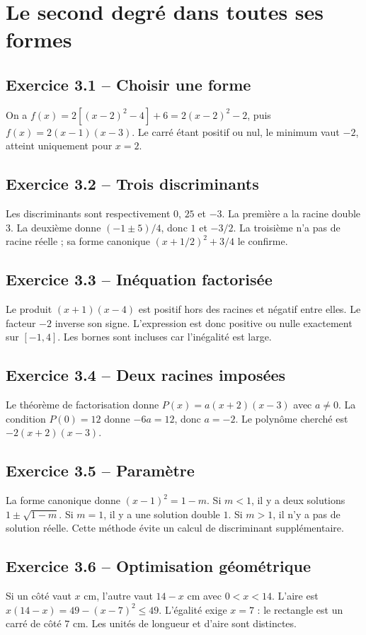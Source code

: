 \chapter{Le second degré dans toutes ses formes}
\section*{Exercice 3.1 -- Choisir une forme}
On a $f(x)=2[(x-2)^2-4]+6=2(x-2)^2-2$, puis $f(x)=2(x-1)(x-3)$. Le carré étant positif ou nul, le minimum vaut $-2$, atteint uniquement pour $x=2$.

\section*{Exercice 3.2 -- Trois discriminants}
Les discriminants sont respectivement $0$, $25$ et $-3$. La première a la racine double $3$. La deuxième donne $(-1\pm5)/4$, donc $1$ et $-3/2$. La troisième n'a pas de racine réelle ; sa forme canonique $(x+1/2)^2+3/4$ le confirme.

\section*{Exercice 3.3 -- Inéquation factorisée}
Le produit $(x+1)(x-4)$ est positif hors des racines et négatif entre elles. Le facteur $-2$ inverse son signe. L'expression est donc positive ou nulle exactement sur $[-1,4]$. Les bornes sont incluses car l'inégalité est large.

\section*{Exercice 3.4 -- Deux racines imposées}
Le théorème de factorisation donne $P(x)=a(x+2)(x-3)$ avec $a\ne0$. La condition $P(0)=12$ donne $-6a=12$, donc $a=-2$. Le polynôme cherché est $-2(x+2)(x-3)$.

\section*{Exercice 3.5 -- Paramètre}
La forme canonique donne $(x-1)^2=1-m$. Si $m<1$, il y a deux solutions $1\pm\sqrt{1-m}$. Si $m=1$, il y a une solution double $1$. Si $m>1$, il n'y a pas de solution réelle. Cette méthode évite un calcul de discriminant supplémentaire.

\section*{Exercice 3.6 -- Optimisation géométrique}
Si un côté vaut $x$ cm, l'autre vaut $14-x$ cm avec $0<x<14$. L'aire est $x(14-x)=49-(x-7)^2\le49$. L'égalité exige $x=7$ : le rectangle est un carré de côté $7$ cm. Les unités de longueur et d'aire sont distinctes.
